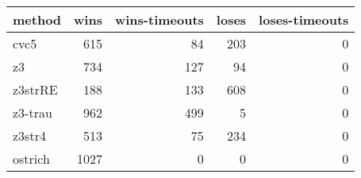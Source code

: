 \begin{tabular}{lrrrr}
\hline
 method   &   wins &   wins-timeouts &   loses &   loses-timeouts \\
\hline
 cvc5     &    615 &              84 &     203 &                0 \\
 z3       &    734 &             127 &      94 &                0 \\
 z3strRE  &    188 &             133 &     608 &                0 \\
 z3-trau  &    962 &             499 &       5 &                0 \\
 z3str4   &    513 &              75 &     234 &                0 \\
 ostrich  &   1027 &               0 &       0 &                0 \\
\hline
\end{tabular}
